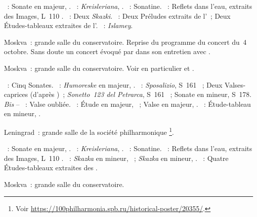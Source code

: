 \begin{description}
 \textsc{\Beethoven{}}~: Sonate en \kE \Flat majeur, .
 \textsc{\Schumann{}}~: \emph{Kreisleriana}, .
 \textsc{\Ravel{}}~: Sonatine.
 \textsc{\Debussy{}}~: Reflets dans l'eau, extraits des Images, L~110
 .
 \textsc{\Medtner{}}~: Deux \emph{Skazki}.
 \textsc{\Rachmaninov{}}~: Deux Préludes extraits de l'~; Deux
 Études-tableaux extraites de l'.
 \textsc{\Balakirev{}}~: \emph{Islamey}.
 \item[\DateWithWeekDay{1945-10-22}]
 Moskva~: grande salle du conservatoire.
 Reprise du programme du concert du~4 octobre.
 Sans doute un concert évoqué par \VSofronitsky{} dans son entretien avec
 \citet{Vitsinsky}.
 \item[\DateWithWeekDay{1945-11-12}]
 Moskva~: grande salle du conservatoire.
 Voir en particulier \citet[p.~442]{Milshteyn82a} et
 \citet[p.~394]{Nikonovich08}.

 \textsc{\Scarlatti{}}~: Cinq Sonates.
 \textsc{\Schumann{}}~: \emph{Humoreske} en \kB \Flat majeur, .
 \textsc{\Liszt{}}~: \emph{Sposalizio}, S~161 ~; Deux
 Valses-caprices (d'après \Schubert{})~; \emph{Sonetto~123 del Petrarca},
 S~161 ~; Sonate en \kB mineur, S~178.
 \emph{Bis} -- \textsc{\Liszt{}}~: Valse oubliée.
 \textsc{\Chopin{}}~: Étude en \kG \Flat majeur,  ~;
 Valse  en \kA \Flat majeur,  .
 \textsc{\Rachmaninov{}}~: Étude-tableau en \kA mineur, 
 .
 \item[\DateWithWeekDay{1945-11-23}]
 Leningrad~: grande salle de la société philharmonique%
 \footnote{Voir
 \href{https://100philharmonia.spb.ru/historical-poster/20355/}%
 {https://100philharmonia.spb.ru/historical-poster/20355/}.}.

 \textsc{\Beethoven{}}~: Sonate  en \kE \Flat majeur, .
 \textsc{\Schumann{}}~: \emph{Kreisleriana}, .
 \textsc{\Ravel{}}~: Sonatine.
 \textsc{\Debussy{}}~: Reflets dans l'eau, extraits des Images, L~110
 .
 \textsc{\Medtner{}}~: \emph{Skazka} en \kB \Flat mineur, 
 ~; \emph{Skazka} en \kB mineur,  .
 \textsc{\Rachmaninov{}}~: Quatre Études-tableaux extraites des .
 \item[\DateWithWeekDay{1945-12-12}]
 Moskva~: grande salle du conservatoire.


\end{description}
